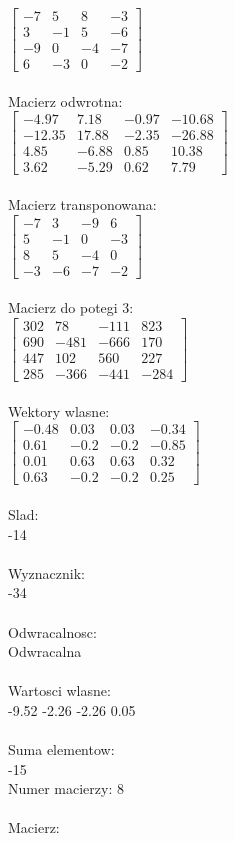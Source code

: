 \documentclass[a4paper,12pt]{article}
\begin{document}
$\begin{bmatrix} -7&5&8&-3\\3&-1&5&-6\\-9&0&-4&-7\\6&-3&0&-2 \end{bmatrix}$
\\
\\
Macierz odwrotna:\\

$\begin{bmatrix} -4.97&7.18&-0.97&-10.68\\-12.35&17.88&-2.35&-26.88\\4.85&-6.88&0.85&10.38\\3.62&-5.29&0.62&7.79 \end{bmatrix}$
\\
\\
Macierz transponowana:\\

$\begin{bmatrix} -7&3&-9&6\\5&-1&0&-3\\8&5&-4&0\\-3&-6&-7&-2 \end{bmatrix}$
\\
\\
Macierz do potegi 3:\\

$\begin{bmatrix} 302&78&-111&823\\690&-481&-666&170\\447&102&560&227\\285&-366&-441&-284 \end{bmatrix}$
\\
\\
Wektory wlasne:\\

$\begin{bmatrix} -0.48&0.03&0.03&-0.34\\0.61&-0.2&-0.2&-0.85\\0.01&0.63&0.63&0.32\\0.63&-0.2&-0.2&0.25 \end{bmatrix}$
\\
\\
Slad:\\
-14
\\
\\
Wyznacznik:\\
-34
\\
\\
Odwracalnosc:\\
Odwracalna
\\
\\
Wartosci wlasne:\\
-9.52 -2.26 -2.26 0.05
\\
\\
Suma elementow:\\
-15
\\
\newpage
Numer macierzy:
8
\\
\\
Macierz:\\
\end{document}
